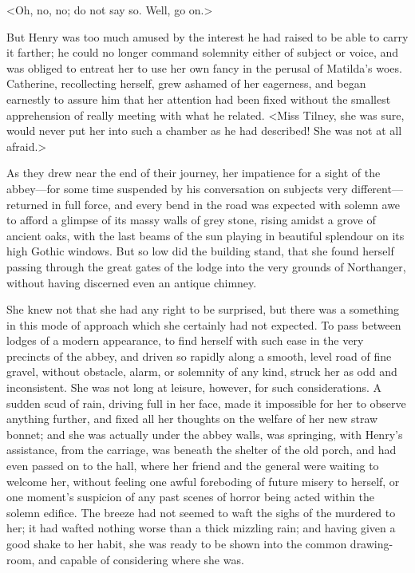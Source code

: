  <Oh, no, no; do not say so. Well, go on.> 

 But Henry was too much amused by the interest he had raised to be able to carry it farther; he could no longer command solemnity either of subject or voice, and was obliged to entreat her to use her own fancy in the perusal of Matilda's woes. Catherine, recollecting herself, grew ashamed of her eagerness, and began earnestly to assure him that her attention had been fixed without the smallest apprehension of really meeting with what he related. <Miss Tilney, she was sure, would never put her into such a chamber as he had described! She was not at all afraid.> 

 As they drew near the end of their journey, her impatience for a sight of the abbey—for some time suspended by his conversation on subjects very different—returned in full force, and every bend in the road was expected with solemn awe to afford a glimpse of its massy walls of grey stone, rising amidst a grove of ancient oaks, with the last beams of the sun playing in beautiful splendour on its high Gothic windows. But so low did the building stand, that she found herself passing through the great gates of the lodge into the very grounds of Northanger, without having discerned even an antique chimney. 

 She knew not that she had any right to be surprised, but there was a something in this mode of approach which she certainly had not expected. To pass between lodges of a modern appearance, to find herself with such ease in the very precincts of the abbey, and driven so rapidly along a smooth, level road of fine gravel, without obstacle, alarm, or solemnity of any kind, struck her as odd and inconsistent. She was not long at leisure, however, for such considerations. A sudden scud of rain, driving full in her face, made it impossible for her to observe anything further, and fixed all her thoughts on the welfare of her new straw bonnet; and she was actually under the abbey walls, was springing, with Henry's assistance, from the carriage, was beneath the shelter of the old porch, and had even passed on to the hall, where her friend and the general were waiting to welcome her, without feeling one awful foreboding of future misery to herself, or one moment's suspicion of any past scenes of horror being acted within the solemn edifice. The breeze had not seemed to waft the sighs of the murdered to her; it had wafted nothing worse than a thick mizzling rain; and having given a good shake to her habit, she was ready to be shown into the common drawing-room, and capable of considering where she was. 

